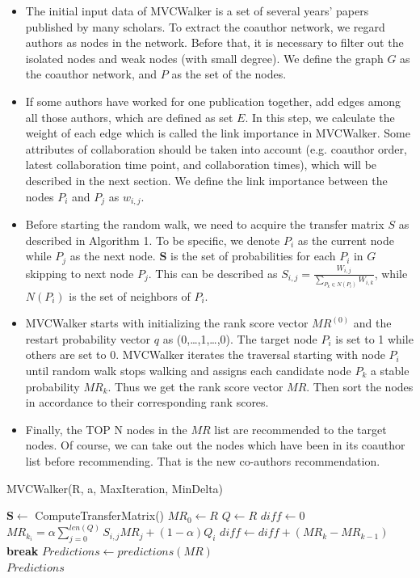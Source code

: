 \documentclass[10pt,journal,compsoc]{IEEEtran}
\newcommand{\algorithmicbreak}{\textbf{break}}
\newcommand{\BREAK}{\State \algorithmicbreak}
\begin{document}
\begin{itemize}
\item The initial input data of MVCWalker is a set of several years' papers published by many scholars. To extract the coauthor network, we regard authors as nodes in the network. Before that, it is necessary to filter out the isolated nodes and weak nodes (with small degree). We define the graph $G$ as the coauthor network, and $P$ as the set of the nodes.
\item If some authors have worked for one publication together, add edges among all those authors, which are defined as set $E$. In this step, we calculate the weight of each edge which is called the link importance in MVCWalker. Some attributes of collaboration should be taken into account (e.g. coauthor order, latest collaboration time point, and collaboration times), which will be described in the next section. We define the link importance between the nodes $P_{i}$ and $P_{j}$ as $w_{i,j}$.
\item Before starting the random walk, we need to acquire the transfer matrix $S$ as described in Algorithm 1. To be specific, we denote $P_{i}$ as the current node while $P_{j}$ as the next node. $\mathbf{S}$ is the set of probabilities for each $P_{i}$ in $G$ skipping to next node $P_{j}$. This can be described as $S_{i,j}=\frac{W_{i,j}}{\sum_{P_{k}\in N(P_{i})} W_{i,k}}$, while $N(P_{i})$ is the set of neighbors of $P_{i}$.
\item MVCWalker starts with initializing the rank score vector $MR^{(0)}$ and the restart probability vector $q$ as (0,\ldots,1,\ldots,0). The target node $P_{i}$ is set to 1 while others are set to 0. MVCWalker iterates the traversal starting with node $P_{i}$ until random walk stops walking and assigns each candidate node $P_{k}$ a stable probability $MR_{k}$. Thus we get the rank score vector $MR$. Then sort the nodes in accordance to their corresponding rank scores.
\item Finally, the TOP N nodes in the $MR$ list are recommended to the target nodes. Of course, we can take out the nodes which have been in its coauthor list before recommending. That is the new co-authors recommendation.
\end{itemize}

\begin{algorithm}
  \caption{MVCWalker(R, a, MaxIteration, MinDelta)}
  \begin{algorithmic}[1]
    \State $\mathbf{S}\leftarrow$ ComputeTransferMatrix()
    \State $MR_{0} \leftarrow R$
    \State $Q \leftarrow R$
        \State $diff \leftarrow 0$
            \State $MR_{k_{i}} = \alpha\sum_{j=0}^{len(Q)} S_{i,j}MR_{j}+(1-\alpha) Q_{i}$
            \State $diff \leftarrow diff +(MR_{k}-MR_{k-1})$
        \EndFor
            \BREAK
        \EndIf
    \EndFor
    \State $Predictions \leftarrow predictions(MR)$\\
    \Return $Predictions$
  \end{algorithmic}
\end{algorithm}
\end{document}

